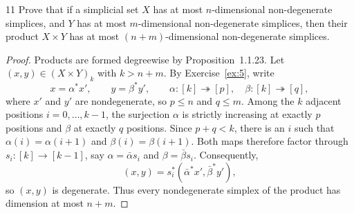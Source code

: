 \begin{exercise}{11}
Prove that if a simplicial set $X$ has at most $n$-dimensional
non-degenerate simplices, and $Y$ has at most $m$-dimensional
non-degenerate simplices, then their product $X\times Y$ has at most
$(n+m)$-dimensional non-degenerate simplices.

\begin{proof}
Products are formed degreewise by Proposition~1.1.23.
Let $(x,y)\in(X\times Y)_k$ with $k>n+m$.
By Exercise~\ref{ex:5}, write
\[
 x=\alpha^*x',\qquad y=\beta^*y',\qquad
 \alpha\colon[k]\twoheadrightarrow[p],\quad
 \beta\colon[k]\twoheadrightarrow[q],
\]
where $x'$ and $y'$ are nondegenerate, so $p\le n$ and $q\le m$.
Among the $k$ adjacent positions $i=0,\ldots,k-1$, the surjection
$\alpha$ is strictly increasing at exactly $p$ positions and $\beta$
at exactly $q$ positions. Since $p+q<k$, there is an $i$ such that
$\alpha(i)=\alpha(i+1)$ and $\beta(i)=\beta(i+1)$.
Both maps therefore factor through $s_i\colon[k]\to[k-1]$, say
$\alpha=\bar\alpha s_i$ and $\beta=\bar\beta s_i$. Consequently,
\[
 (x,y)=s_i^*(\bar\alpha^*x',\bar\beta^*y'),
\]
so $(x,y)$ is degenerate. Thus every nondegenerate simplex of the
product has dimension at most $n+m$.
\end{proof}
\end{exercise}
